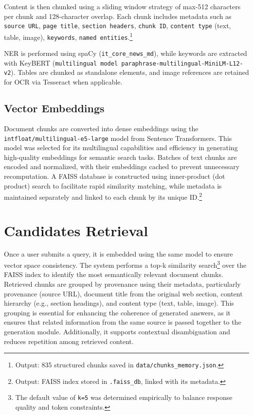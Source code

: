 \begin{spacing}{1.5}
Content is then chunked using a sliding window strategy of max-512 characters per chunk and 128-character overlap. Each chunk includes metadata such as \texttt{source URL}, \texttt{page title}, \texttt{section headers}, \texttt{chunk ID}, \texttt{content type} (text, table, image), \texttt{keywords}, \texttt{named entities}.\footnote{Output: 835 structured chunks saved in \texttt{data/chunks\_memory.json}.}

NER is performed using spaCy (\texttt{it\_core\_news\_md}), while keywords are extracted with KeyBERT (\texttt{multilingual model paraphrase-multilingual-MiniLM-L12-v2}). Tables are chunked as standalone elements, and image references are retained for OCR via Tesseract when applicable.

\sloppy
\subsection{Vector Embeddings}
Document chunks are converted into dense embeddings using the \texttt{intfloat/multilingual-e5-large} model from Sentence Transformers. This model was selected for its multilingual capabilities and efficiency in generating high-quality embeddings for semantic search tasks. Batches of text chunks are encoded and normalized, with their embeddings cached to prevent unnecessary recomputation. A FAISS database is constructed using inner-product (dot product) search to facilitate rapid similarity matching, while metadata is maintained separately and linked to each chunk by its unique ID.\footnote{Output: FAISS index stored in \texttt{.faiss\_db}, linked with its metadata.}

\section{Candidates Retrieval}
Once a user submits a query, it is embedded using the same model to ensure vector space consistency. The system performs a top-k similarity search\footnote{The default value of \texttt{k=5} was determined empirically to balance response quality and token constraints.} over the FAISS index to identify the most semantically relevant document chunks. Retrieved chunks are grouped by provenance using their metadata, particularly provenance (source URL), document title from the original web section, content hierarchy (e.g., section headings), and content type (text, table, image). This grouping is essential for enhancing the coherence of generated answers, as it ensures that related information from the same source is passed together to the generation module. Additionally, it supports contextual disambiguation and reduces repetition among retrieved content.


\end{spacing}
